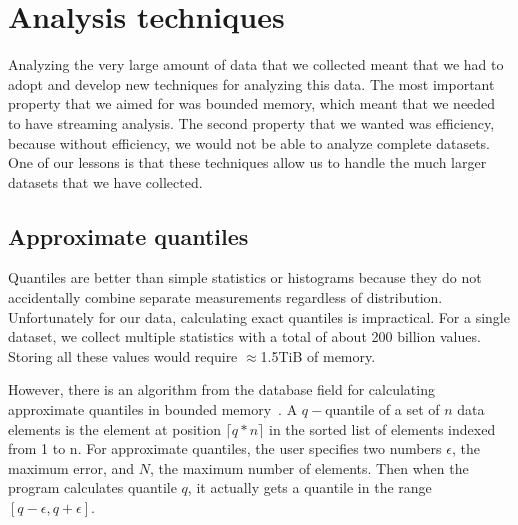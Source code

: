 \section{Analysis techniques}
\label{sec:analysis-techniques}

Analyzing the very large amount of data that we collected meant that
we had to adopt and develop new techniques for analyzing this data.
The most important property that we aimed for was bounded memory,
which meant that we needed to have streaming analysis.  The second
property that we wanted was efficiency, because without efficiency, we
would not be able to analyze complete datasets.  One of our lessons is
that these techniques allow us to handle the much larger datasets that
we have collected.

\subsection{Approximate quantiles}



Quantiles are better than simple statistics or histograms because they
do not accidentally combine separate measurements regardless of
distribution.  Unfortunately for our data, calculating exact quantiles
is impractical.  For a single dataset, we collect multiple statistics
with a total of about 200 billion values.  Storing all these values
would require $\approx$1.5TiB of memory.

However, there is an algorithm from the database field for calculating
approximate quantiles in bounded
memory~\cite{Manku98approximatemedians}.  A $q-$quantile of a set of
$n$ data elements is the element at position $\lceil q*n\rceil$ in the
sorted list of elements indexed from 1 to n.  For approximate
quantiles, the user specifies two numbers $\epsilon$, the maximum
error, and $N$, the maximum number of elements.  Then when the program
calculates quantile $q$, it actually gets a quantile in the range
$[q-\epsilon,q+\epsilon]$.  

